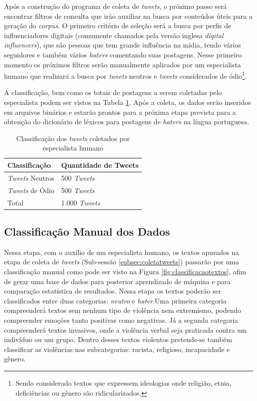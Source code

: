 Após a construção do programa de coleta de \textit{tweets}, o próximo passo será encontrar filtros de consulta que irão auxiliar na busca por conteúdos úteis para a geração do \textit{corpus}. O primeiro critério de seleção será a busca por perfis de influenciadores digitais (comumente chamados pela versão inglesa \textit{digital influencers}), que são pessoas que tem grande influência na mídia, tendo vários seguidores e também vários \textit{haters} comentando suas postagens. Nesse primeiro momento os próximos filtros serão manualmente aplicados por um especialista humano que realizará a busca por \textit{tweets} neutros e \textit{tweets} considerados de ódio\footnote{Sendo considerado textos que expressem ideologias onde religião, etnia, deficiências ou gênero são ridicularizados.}. 

A classificação, bem como os totais de postagens a serem coletadas pelo especialista podem ser vistos na Tabela \ref{tab:classificacaotweets}.
Após a coleta, os dados serão inseridos em arquivos binários e estarão prontos para a próxima etapa prevista para a obtenção do dicionário de léxicos para postagens de \textit{haters} na língua portuguesa.
\begin{table}[h!]
  \begin{center}
    \caption{Classificação dos \textit{tweets} coletados por especialista humano}
    \label{tab:classificacaotweets}
    \begin{tabular}{ll} %
    \textbf{Classificação} & \textbf{Quantidade de Tweets}\\
    \hline
    \textit{Tweets} Neutros&500 \textit{Tweets}\\
    \textit{Tweets} de Ódio&500 \textit{Tweets}\\
    \hline
    Total&1.000 \textit{Tweets}\\
    \end{tabular}
  \end{center}
\end{table}

\subsection{Classificação Manual dos Dados}
\label{subsec:classmanual}
Nessa etapa, com o auxílio de um especialista humano, os textos apurados na etapa de coleta de \textit{tweets} (Sub-sessão \ref{subsec:coletatweets}) passarão por uma classificação manual como pode ser visto na Figura \ref{fig:classificacaotextos}, afim de gerar uma base de dados para posterior aprendizado de máquina e para comparação estatística de resultados. 
Nessa etapa os textos poderão ser classificados entre duas categorias: \textit{neutro} e \textit{hater}.Uma primeira categoria compreenderá textos sem nenhum tipo de violência nem extremismo, podendo compreender emoções tanto positivas como negativas. Já a segunda categoria compreenderá textos invasivos, onde a violência verbal seja praticada contra um indivíduo ou um grupo. Dentro desses textos violentos pretende-se também classificar as violências nas subcategorias: racista, religioso, incapacidade e gênero.  

